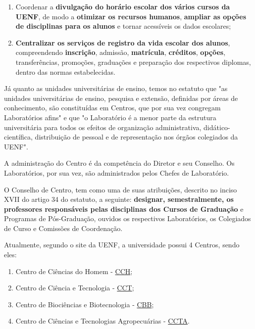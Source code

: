     \begin{enumerate}
        \item Coordenar a \textbf{divulgação do horário escolar dos vários cursos da UENF}, de modo a \textbf{otimizar os recursos humanos}, \textbf{ampliar as opções de disciplinas para os alunos} e tornar acessíveis os dados escolares;
        \item \textbf{Centralizar os serviços de registro da vida escolar dos alunos}, compreendendo \textbf{inscrição}, admissão, \textbf{matrícula}, \textbf{créditos}, \textbf{opções}, transferências, promoções, graduações e preparação dos respectivos diplomas, dentro das normas estabelecidas.
    \end{enumerate}

    Já quanto as unidades universitárias de ensino, temos no estatuto que "as unidades universitárias de ensino, pesquisa e extensão, definidas por áreas de conhecimento, são constituídas em Centros, que por sua vez congregam Laboratórios afins" e que "o Laboratório é a menor parte da estrutura universitária para todos os efeitos de organização administrativa, didático-científica, distribuição de pessoal e de representação nos órgãos colegiados da UENF".

    A administração do Centro é da competência do Diretor e seu Conselho. Os Laboratórios, por sua vez, são administrados pelos Chefes de Laboratório.

    O Conselho de Centro, tem como uma de suas atribuições, descrito no inciso XVII do artigo 34 do estatuto, a seguinte: \textbf{designar, semestralmente, os professores responsáveis pelas disciplinas dos Cursos de Graduação} e Programas de Pós-Graduação, ouvidos os respectivos Laboratórios, os Colegiados de Curso e Comissões de Coordenação.

    Atualmente, segundo o site da UENF, a universidade possui 4 Centros, sendo eles:

    \begin{enumerate}
        \item Centro de Ciências do Homem - \href{https://uenf.br/}{CCH};
        \item Centro de Ciência e Tecnologia - \href{https://uenf.br/cct/}{CCT};
        \item Centro de Biociências e Biotecnologia - \href{https://uenf.br/}{CBB};
        \item Centro de Ciências e Tecnologias Agropecuárias - \href{https://uenf.br/}{CCTA}.
    \end{enumerate}

